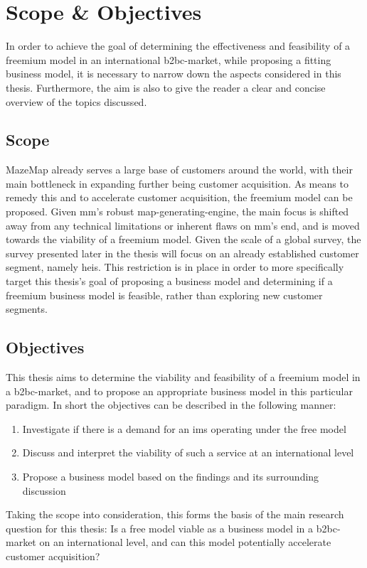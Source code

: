 \section{Scope \& Objectives}
In order to achieve the goal of determining the effectiveness and feasibility of a freemium model in an international \gls{b2bc}-market, while proposing a fitting business model, it is necessary to narrow down the aspects considered in this thesis. Furthermore, the aim is also to give the reader a clear and concise overview of the topics discussed.

\subsection{Scope}
MazeMap already serves a large base of customers around the world, with their main bottleneck in expanding further being customer acquisition. As means to remedy this and to accelerate customer acquisition, the freemium model can be proposed. Given \gls{mm}'s robust map-generating-engine, the main focus is shifted away from any technical limitations or inherent flaws on \gls{mm}'s end, and is moved towards the viability of a freemium model. Given the scale of a global survey, the survey presented later in the thesis will focus on an already established customer segment, namely \gls{hei}s. This restriction is in place in order to more specifically target this thesis's goal of proposing a business model and determining if a freemium business model is feasible, rather than exploring new customer segments. 

\subsection{Objectives}
This thesis aims to determine the viability and feasibility of a freemium model in a \gls{b2bc}-market, and to propose an appropriate business model in this particular paradigm. In short the objectives can be described in the following manner:
\begin{enumerate}
    \item Investigate if there is a demand for an \gls{ims} operating under the free model
    \item Discuss and interpret the viability of such a service at an international level
    \item Propose a business model based on the findings and its surrounding discussion
\end{enumerate}
Taking the scope into consideration, this forms the basis of the main research question for this thesis: Is a free model viable as a business model in a \gls{b2bc}-market on an international level, and can this model potentially accelerate customer acquisition?

